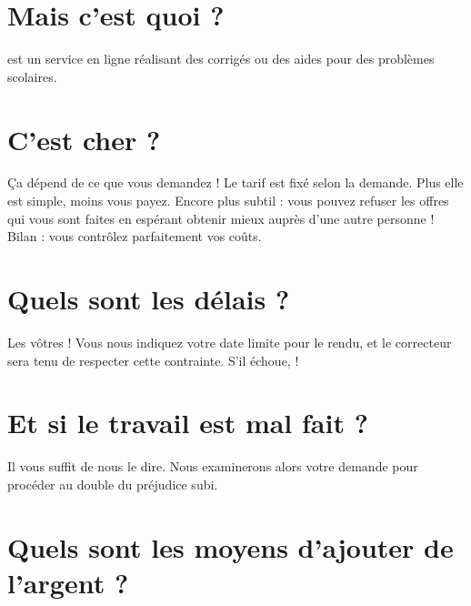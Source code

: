 \section{Mais c'est quoi \eDevoir ?}
\eDevoir est un service en ligne réalisant des corrigés ou des aides pour des problèmes scolaires.

\section{C'est cher ?}
Ça dépend de ce que vous demandez ! Le tarif est fixé selon la demande. Plus elle est simple, moins vous payez.
Encore plus subtil : vous pouvez refuser les offres qui vous sont faites en espérant obtenir mieux auprès d'une autre personne ! Bilan : vous contrôlez parfaitement vos coûts.

\section{Quels sont les délais ?}
Les vôtres ! Vous nous indiquez votre date limite pour le rendu, et le correcteur sera tenu de respecter cette contrainte. S'il échoue,  !

\section{Et si le travail est mal fait ?}
Il vous suffit de nous le dire. Nous examinerons alors votre demande pour procéder  au double du préjudice subi.

\section{Quels sont les moyens d'ajouter de l'argent ?}